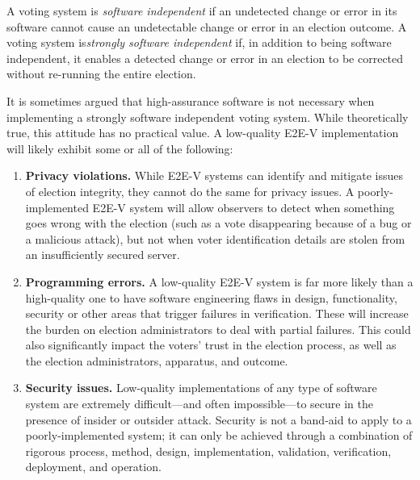 A voting system is \emph{software independent} if an undetected change
or error in its software cannot cause an undetectable change or error
in an election outcome. A voting system is\emph{strongly software
  independent} if, in addition to being software independent, it
enables a detected change or error in an election to be corrected
without re-running the entire election.

It is sometimes argued that high-assurance software is not necessary
when implementing a strongly software independent voting system. While
theoretically true, this attitude has no practical value. A
low-quality E2E-V implementation will likely exhibit some or all of
the following:

\begin{enumerate}
\item \textbf{Privacy violations.} While E2E-V systems can identify
  and mitigate issues of election integrity, they cannot do the same
  for privacy issues. A poorly-implemented E2E-V system will allow
  observers to detect when something goes wrong with the election
  (such as a vote disappearing because of a bug or a malicious
  attack), but not when voter identification details are stolen from
  an insufficiently secured server.
\item \textbf{Programming errors.} A low-quality E2E-V system is far
  more likely than a high-quality one to have software engineering
  flaws in design, functionality, security or other areas that trigger
  failures in verification. These will increase the burden on election
  administrators to deal with partial failures. This could also
  significantly impact the voters' trust in the election process, as
  well as the election administrators, apparatus, and outcome.
\item \textbf{Security issues.} Low-quality implementations of any
  type of software system are extremely difficult---and often
  impossible---to secure in the presence of insider or outsider
  attack. Security is not a band-aid to apply to a poorly-implemented
  system; it can only be achieved through a combination of rigorous
  process, method, design, implementation, validation, verification,
  deployment, and operation.
\end{enumerate}

